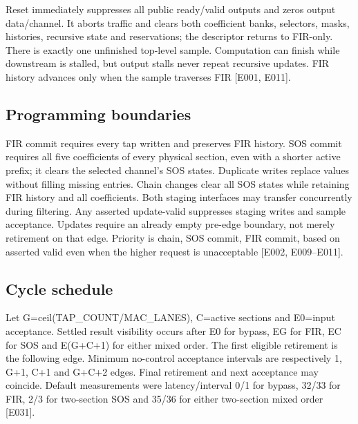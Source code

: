 \documentclass[11pt,a4paper]{article}
\begin{document}
Reset immediately suppresses all public ready/\allowbreak{}valid outputs and zeros output data/\allowbreak{}channel. It aborts traffic and clears both coefficient banks,\allowbreak{} selectors,\allowbreak{} masks,\allowbreak{} histories,\allowbreak{} recursive state and reservations; the descriptor returns to FIR-only. There is exactly one unfinished top-level sample. Computation can finish while downstream is stalled,\allowbreak{} but output stalls never repeat recursive updates. FIR history advances only when the sample traverses FIR [\allowbreak{}E001,\allowbreak{} E011]\allowbreak{}.

\subsection{Programming boundaries}

FIR commit requires every tap written and preserves FIR history. SOS commit requires all five coefficients of every physical section,\allowbreak{} even with a shorter active prefix; it clears the selected channel's SOS states. Duplicate writes replace values without filling missing entries. Chain changes clear all SOS states while retaining FIR history and all coefficients. Both staging interfaces may transfer concurrently during filtering. Any asserted update-valid suppresses staging writes and sample acceptance. Updates require an already empty pre-edge boundary,\allowbreak{} not merely retirement on that edge. Priority is chain,\allowbreak{} SOS commit,\allowbreak{} FIR commit,\allowbreak{} based on asserted valid even when the higher request is unacceptable [\allowbreak{}E002,\allowbreak{} E009–E011]\allowbreak{}.

\subsection{Cycle schedule}

Let G=\allowbreak{}ceil(\allowbreak{}TAP\_\allowbreak{}COUNT/\allowbreak{}MAC\_\allowbreak{}LANES)\allowbreak{},\allowbreak{} C=\allowbreak{}active sections and E0=\allowbreak{}input acceptance. Settled result visibility occurs after E0 for bypass,\allowbreak{} EG for FIR,\allowbreak{} EC for SOS and E(\allowbreak{}G+\allowbreak{}C+\allowbreak{}1)\allowbreak{} for either mixed order. The first eligible retirement is the following edge. Minimum no-control acceptance intervals are respectively 1,\allowbreak{} G+\allowbreak{}1,\allowbreak{} C+\allowbreak{}1 and G+\allowbreak{}C+\allowbreak{}2 edges. Final retirement and next acceptance may coincide. Default measurements were latency/\allowbreak{}interval 0/\allowbreak{}1 for bypass,\allowbreak{} 32/\allowbreak{}33 for FIR,\allowbreak{} 2/\allowbreak{}3 for two-section SOS and 35/\allowbreak{}36 for either two-section mixed order [\allowbreak{}E031]\allowbreak{}.
\end{document}
